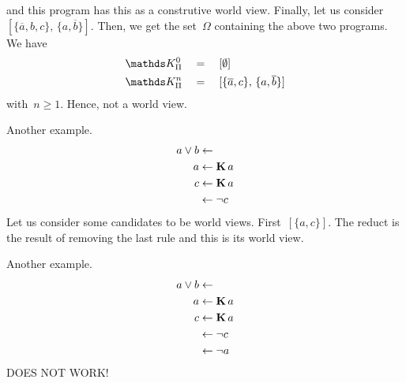 and this program has this as a construtive world view.
%
Finally, let us consider~$[ \{ \overline{a}, b, c \},\, \{ a, \overline{b} \} ]$.
%
Then, we get the set~$\Omega$ containing the above two programs.
%
We have
\begin{align}
    \TKPnn{0} \quad & =\quad   [\emptyset]
    \\
    \TKPnn{n} \quad & =\quad   [\{\overline{a}, c \},\, \{ a, \overline{b} \}]
\end{align}
with~$n \geq 1$.
%
Hence, not a world view.

Another example.
\begin{align}
    a \vee b & \leftarrow 
    \\
    a & \leftarrow \operatorname{\mathbf{K}} a
    \\
    c & \leftarrow \operatorname{\mathbf{K}} a
    \\
    & \leftarrow \neg c
\end{align}
Let us consider some candidates to be world views. First~$[ \{ a,c \} ]$.
%
The reduct is the result of removing the last rule and this is its world view.

Another example.
\begin{align}
    a \vee b & \leftarrow 
    \\
    a & \leftarrow \operatorname{\mathbf{K}} a
    \\
    c & \leftarrow \operatorname{\mathbf{K}} a
    \\
    & \leftarrow \neg c
    \\
    & \leftarrow \neg a
\end{align}
DOES NOT WORK!